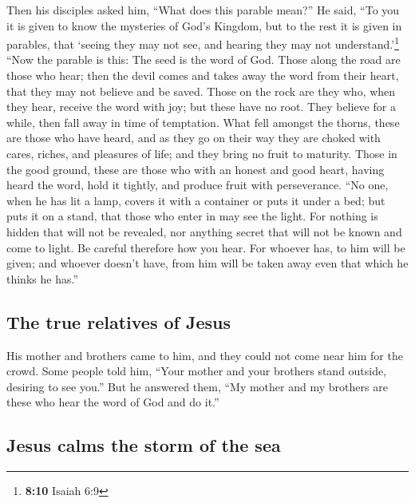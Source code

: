  Then his disciples asked him, ``What does this parable
mean?''  He said, ``To you it is given to know the
mysteries of God's Kingdom, but to the rest it is given in parables,
that `seeing they may not see, and hearing they may not
understand.'\footnote{\textbf{8:10} Isaiah 6:9}  ``Now
the parable is this: The seed is the word of God.  Those
along the road are those who hear; then the devil comes and takes away
the word from their heart, that they may not believe and be saved.
 Those on the rock are they who, when they hear, receive
the word with joy; but these have no root. They believe for a while,
then fall away in time of temptation.  What fell amongst
the thorns, these are those who have heard, and as they go on their way
they are choked with cares, riches, and pleasures of life; and they
bring no fruit to maturity.  Those in the good ground,
these are those who with an honest and good heart, having heard the
word, hold it tightly, and produce fruit with perseverance.
 ``No one, when he has lit a lamp, covers it with a
container or puts it under a bed; but puts it on a stand, that those who
enter in may see the light.  For nothing is hidden that
will not be revealed, nor anything secret that will not be known and
come to light.  Be careful therefore how you hear. For
whoever has, to him will be given; and whoever doesn't have, from him
will be taken away even that which he thinks he has.''

\hypertarget{the-true-relatives-of-jesus}{%
\subsection{The true relatives of
Jesus}\label{the-true-relatives-of-jesus}}

 His mother and brothers came to him, and they could not
come near him for the crowd.  Some people told him,
``Your mother and your brothers stand outside, desiring to see you.''
 But he answered them, ``My mother and my brothers are
these who hear the word of God and do it.''

\hypertarget{jesus-calms-the-storm-of-the-sea}{%
\subsection{Jesus calms the storm of the
sea}\label{jesus-calms-the-storm-of-the-sea}}

